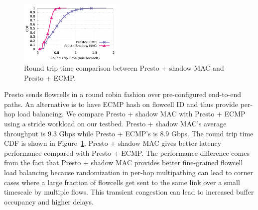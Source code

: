 \begin{figure}[!t]
        \centering
  \includegraphics[width=0.45\textwidth]{presto/figures/presto_compare_2modes/presto_compare_2mods.pdf}
        \caption{Round trip time comparison between Presto + shadow MAC and Presto + ECMP.
		}
        \label{micro_presto_2mods}
\end{figure}

Presto sends flowcells in a round robin fashion over pre-configured end-to-end paths. An alternative is to
have ECMP hash on flowcell ID and thus provide per-hop load balancing. 
We compare Presto + shadow MAC with Presto + ECMP using a stride workload on our testbed. 
Presto + shadow MAC's average throughput is 9.3 Gbps while Presto + ECMP's is 8.9 Gbps.
The round trip time CDF is shown in Figure~\ref{micro_presto_2mods}. 
Presto + shadow MAC gives better latency performance compared with Presto + ECMP. 
The performance difference comes from the fact that Presto + shadow MAC provides 
better fine-grained flowcell load balancing because 
randomization in per-hop multipathing can lead to corner cases where
a large fraction of flowcells get sent to the same link over a small timescale by multiple flows. This transient congestion
can lead to increased buffer occupancy and higher delays.

